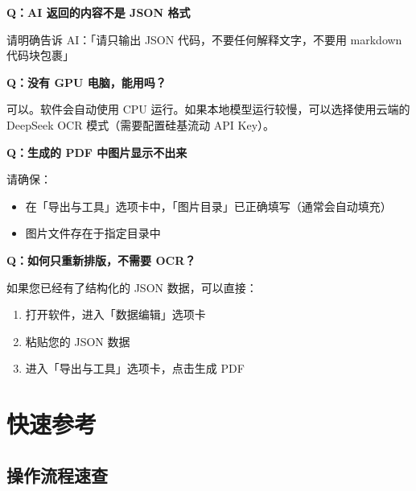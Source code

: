 \documentclass[UTF8,zihao=-4,openany]{ctexbook}
\begin{document}
\begin{QABox}
	\textbf{Q：AI 返回的内容不是 JSON 格式}

	请明确告诉 AI：「请只输出 JSON 代码，不要任何解释文字，不要用 markdown 代码块包裹」
\end{QABox}

\begin{QABox}
	\textbf{Q：没有 GPU 电脑，能用吗？}

	可以。软件会自动使用 CPU 运行。如果本地模型运行较慢，可以选择使用云端的 DeepSeek OCR 模式（需要配置硅基流动 API Key）。
\end{QABox}

\begin{QABox}
	\textbf{Q：生成的 PDF 中图片显示不出来}

	请确保：
	\begin{itemize}
		\item 在「导出与工具」选项卡中，「图片目录」已正确填写（通常会自动填充）
		\item 图片文件存在于指定目录中
	\end{itemize}
\end{QABox}

\begin{QABox}
	\textbf{Q：如何只重新排版，不需要 OCR？}

	如果您已经有了结构化的 JSON 数据，可以直接：
	\begin{enumerate}
		\item 打开软件，进入「数据编辑」选项卡
		\item 粘贴您的 JSON 数据
		\item 进入「导出与工具」选项卡，点击生成 PDF
	\end{enumerate}
\end{QABox}

\chapter{快速参考}

\section{操作流程速查}
\end{document}
